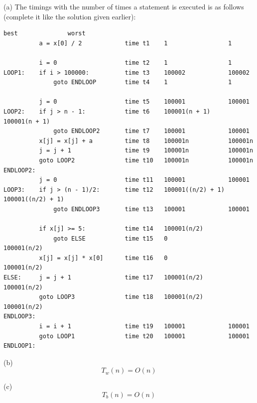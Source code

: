 
(a)
The timings with the number of times a statement is executed
is as follows (complete it like the solution given earlier):
\begin{Verbatim}[frame=single]
                                             best              worst
          a = x[0] / 2            time t1    1                 1

          i = 0                   time t2    1                 1     
LOOP1:    if i > 100000:          time t3    100002            100002
              goto ENDLOOP        time t4    1                 1

          j = 0                   time t5    100001            100001
LOOP2:    if j > n - 1:           time t6    100001(n + 1)     100001(n + 1)
              goto ENDLOOP2       time t7    100001            100001
          x[j] = x[j] + a         time t8    100001n           100001n
          j = j + 1               time t9    100001n           100001n
          goto LOOP2              time t10   100001n           100001n
ENDLOOP2:
          j = 0                   time t11   100001            100001
LOOP3:    if j > (n - 1)/2:       time t12   100001((n/2) + 1) 100001((n/2) + 1) 
              goto ENDLOOP3       time t13   100001            100001 

          if x[j] >= 5:           time t14   100001(n/2)
              goto ELSE           time t15   0                 100001(n/2)
          x[j] = x[j] * x[0]      time t16   0                 100001(n/2)
ELSE:     j = j + 1               time t17   100001(n/2)       100001(n/2)
          goto LOOP3              time t18   100001(n/2)       100001(n/2)
ENDLOOP3:
          i = i + 1               time t19   100001            100001
          goto LOOP1              time t20   100001            100001
ENDLOOP1:
\end{Verbatim}

(b)
\[
T_w(n) = O(n)
\]

(c)
\[
T_b(n) = O(n)
\]
